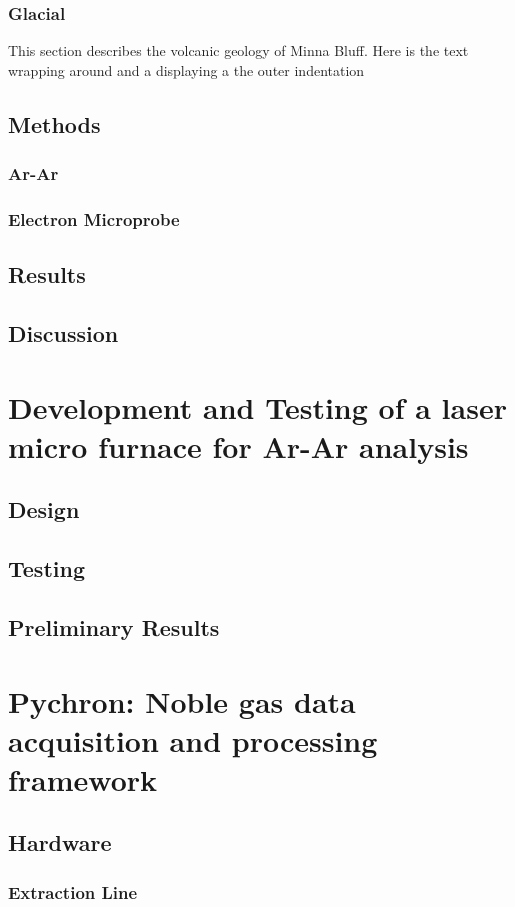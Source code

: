 \documentclass[12pt]{report}
\begin{document}
\subsection{Glacial}
This section describes the volcanic geology of Minna Bluff. Here is the text
wrapping around and a displaying a the outer indentation

\section{Methods}
\subsection{Ar-Ar}
\subsection{Electron Microprobe}
\section{Results}
\section{Discussion}
\chapter{Development and Testing of a laser micro furnace for Ar-Ar analysis}
\section{Design}
\section{Testing}
\section{Preliminary Results}
\chapter{Pychron: Noble gas data acquisition and processing framework}
\section{Hardware}
\subsection{Extraction Line}
\end{document}
